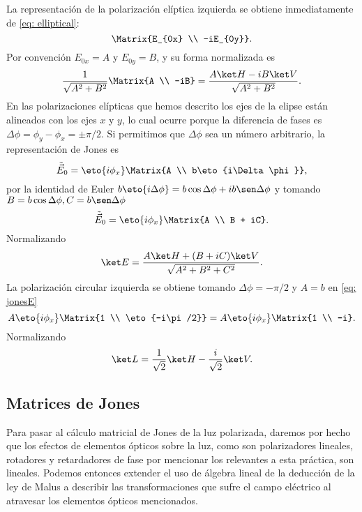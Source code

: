 La representación de la polarización elíptica izquierda se obtiene inmediatamente de \eqref{eq: elliptical}:
\begin{equation}
    \Matrix{E_{0x} \\ -iE_{0y}}.
\end{equation}
Por convención $E_{0x} = A$ y $E_{0y} = B$, y su forma normalizada es
\begin{equation}
    \frac{1}{\sqrt{A^2 + B^2}}\Matrix{A \\ -iB} = \frac{A\ket H - iB\ket V}{\sqrt{A^2 + B^2}}.
\end{equation}
En las polarizaciones elípticas que hemos descrito los ejes de la elipse están alineados con los ejes $x$ y $y$, lo cual ocurre porque la diferencia de fases es $\Delta \phi = \phi_y - \phi_x = \pm \pi/2$. Si permitimos que $\Delta \phi$ sea un número arbitrario, la representación de Jones es
\begin{equation}\label{eq: jonesE}
    \tilde{\vec E}_0 = \eto{i\phi_x} \Matrix{A \\ b\eto{i\Delta \phi}},
\end{equation}
por la identidad de Euler $b\eto{i\Delta \phi} = b\cos\Delta \phi + i b\sen \Delta \phi$ y tomando $B = b\cos \Delta \phi, C = b \sen \Delta \phi$
\begin{equation}
    \tilde{\vec E}_0 = \eto{i\phi_x} \Matrix{A \\ B + iC}.
\end{equation}
Normalizando
\begin{equation}
    \ket E = \frac{A\ket H + (B + iC)\ket V}{\sqrt{A^2 + B^2 + C^2}}.
\end{equation}
La polarización circular izquierda se obtiene tomando $\Delta \phi = -\pi/2$ y $A = b$ en \eqref{eq: jonesE}
\begin{equation}
    A\eto{i\phi_x} \Matrix{1 \\ \eto{-i\pi/2}} = A\eto{i\phi_x} \Matrix{1 \\ -i}.
\end{equation}
Normalizando
\begin{equation}
    \ket L = \frac{1}{\sqrt 2}\ket H - \frac{i}{\sqrt 2}\ket V.
\end{equation}

\subsection{Matrices de Jones}
Para pasar al cálculo matricial de Jones de la luz polarizada, daremos por hecho que los efectos de elementos ópticos sobre la luz, como son polarizadores lineales, rotadores y retardadores de fase por mencionar los relevantes a esta práctica, son lineales. Podemos entonces extender el uso de álgebra lineal de la deducción de la ley de Malus a describir las transformaciones que sufre el campo eléctrico al atravesar los elementos ópticos mencionados.

